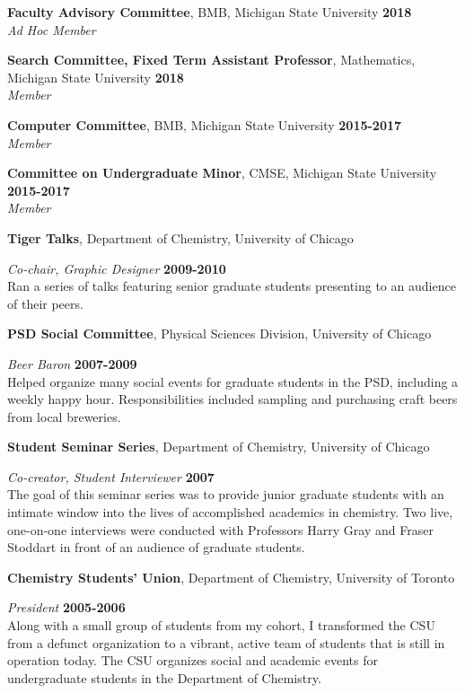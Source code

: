 \documentclass[margin,line]{res}
\begin{document}
\begin{resume}
        {\bf Faculty Advisory Committee}, BMB, Michigan State University \hfill {\bf 2018}\\
        {\emph {Ad Hoc Member}}

        {\bf Search Committee, Fixed Term Assistant Professor}, Mathematics, Michigan State University \hfill {\bf 2018}\\
        {\emph {Member}}
        
        {\bf Computer Committee}, BMB, Michigan State University \hfill {\bf 2015-2017}\\
        {\emph {Member}}

        {\bf Committee on Undergraduate Minor}, CMSE, Michigan State University \hfill {\bf 2015-2017}\\
        {\emph {Member}}

{\bf Tiger Talks}, Department of Chemistry, University of Chicago

\vspace{-.3cm}
{\em Co-chair, Graphic Designer} \hfill {\bf 2009-2010}\\
Ran a series of talks featuring senior graduate students presenting to an audience of their peers.

{\bf PSD Social Committee}, Physical Sciences Division, University of Chicago

\vspace{-.3cm}
{\em Beer Baron} \hfill {\bf 2007-2009}\\
Helped organize many social events for graduate students in the PSD, including a weekly happy
hour. Responsibilities included sampling and purchasing craft beers from local breweries.

{\bf Student Seminar Series}, Department of Chemistry, University of Chicago

\vspace{-.3cm}
{\em Co-creator, Student Interviewer} \hfill {\bf 2007}\\
The goal of this seminar series was to provide junior graduate students with an intimate window into
the lives of accomplished academics in chemistry. Two live, one-on-one interviews were conducted
with Professors Harry Gray and Fraser Stoddart in front of an audience of graduate students.

{\bf Chemistry Students' Union}, Department of Chemistry, University of Toronto

\vspace{-.3cm}
{\em President} \hfill {\bf 2005-2006}\\
Along with a small group of students from my cohort, I transformed the CSU from a defunct
organization to a vibrant, active team of students that is still in operation today. The CSU organizes
social and academic events for undergraduate
students in the Department of Chemistry.


\end{resume}
\end{document}
